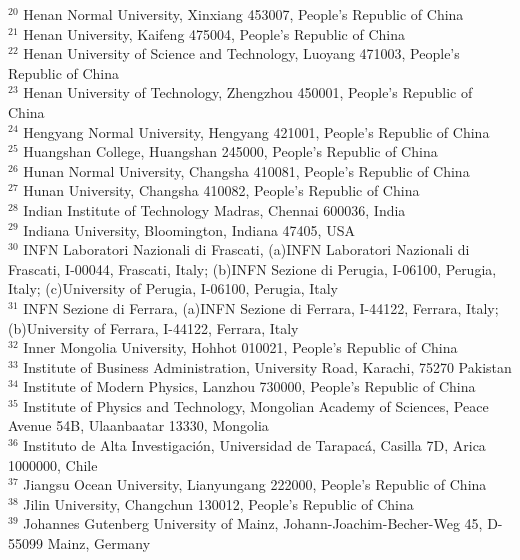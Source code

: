 \documentclass[aps,amsmath,amssymb,reprint]{revtex4-2}
\begin{document}
\begin{widetext}
\begin{center}
{$^{20}$ Henan Normal University, Xinxiang 453007, People's Republic of China\\
$^{21}$ Henan University, Kaifeng 475004, People's Republic of China\\
$^{22}$ Henan University of Science and Technology, Luoyang 471003, People's Republic of China\\
$^{23}$ Henan University of Technology, Zhengzhou 450001, People's Republic of China\\
$^{24}$ Hengyang Normal University, Hengyang 421001, People's Republic of China\\
$^{25}$ Huangshan College, Huangshan 245000, People's Republic of China\\
$^{26}$ Hunan Normal University, Changsha 410081, People's Republic of China\\
$^{27}$ Hunan University, Changsha 410082, People's Republic of China\\
$^{28}$ Indian Institute of Technology Madras, Chennai 600036, India\\
$^{29}$ Indiana University, Bloomington, Indiana 47405, USA\\
$^{30}$ INFN Laboratori Nazionali di Frascati, (a)INFN Laboratori Nazionali di Frascati, I-00044, Frascati, Italy; (b)INFN Sezione di Perugia, I-06100, Perugia, Italy; (c)University of Perugia, I-06100, Perugia, Italy\\
$^{31}$ INFN Sezione di Ferrara, (a)INFN Sezione di Ferrara, I-44122, Ferrara, Italy; (b)University of Ferrara, I-44122, Ferrara, Italy\\
$^{32}$ Inner Mongolia University, Hohhot 010021, People's Republic of China\\
$^{33}$ Institute of Business Administration, University Road, Karachi, 75270 Pakistan\\
$^{34}$ Institute of Modern Physics, Lanzhou 730000, People's Republic of China\\
$^{35}$ Institute of Physics and Technology, Mongolian Academy of Sciences, Peace Avenue 54B, Ulaanbaatar 13330, Mongolia\\
$^{36}$ Instituto de Alta Investigaci\'on, Universidad de Tarapac\'a, Casilla 7D, Arica 1000000, Chile\\
$^{37}$ Jiangsu Ocean University, Lianyungang 222000, People's Republic of China\\
$^{38}$ Jilin University, Changchun 130012, People's Republic of China\\
$^{39}$ Johannes Gutenberg University of Mainz, Johann-Joachim-Becher-Weg 45, D-55099 Mainz, Germany\\
}
\end{center}
\end{widetext}
\end{document}
